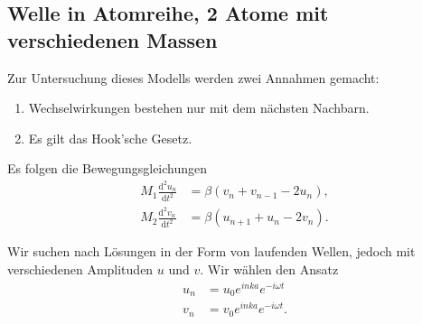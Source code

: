 \setcounter{section}{5}
\setcounter{subsection}{1}
\setcounter{equation}{6}
\setcounter{figure}{6}

\subsection{Welle in Atomreihe, 2 Atome mit verschiedenen Massen}
	\begin{figure}[H]
		\centering
		\label{fig:vl21_abbildung_1}
	\end{figure}

	Zur Untersuchung dieses Modells werden zwei Annahmen gemacht:
	\begin{enumerate}
		\item Wechselwirkungen bestehen nur mit dem nächsten Nachbarn.
		\item Es gilt das Hook'sche Gesetz.
	\end{enumerate}
	Es folgen die Bewegungsgleichungen
	\begin{equation}
		\label{eq:II.5.7}
		\begin{split}
			M_1 \frac{\mathrm{d}^2 u_{n}}{\text{d}t^2} &= \beta \left( v_{n} + v_{n-1} - 2u_{n} \right),  \\
			M_2 \frac{\mathrm{d}^2 v_{n}}{\mathrm{d}t^2} &= \beta \left( u_{n+1} + u_{n} - 2v_{n}  \right).
		\end{split}
	\end{equation}

	Wir suchen nach Lösungen in der Form von laufenden Wellen, jedoch mit verschiedenen Amplituden $u$ und $v$. Wir wählen den Ansatz
	\begin{equation}
		\label{eq:II.5.8}
		\begin{split}
			u_{n} &= u_0 e^{inka} e^{-i \omega t} \\
			v_{n} &= v_0 e^{inka} e^{-i \omega t} .
		\end{split}
	\end{equation}

